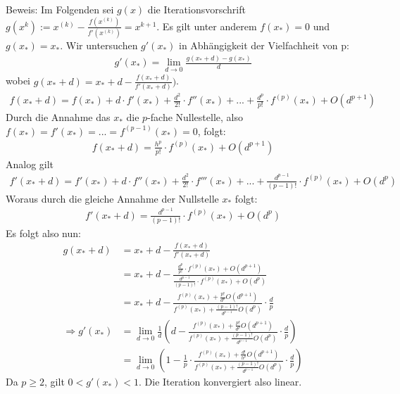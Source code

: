Beweis: Im Folgenden sei $g(x)$ die Iterationsvorschrift $g(x^k):= x^{(k)} - \frac{f(x^{(k)})}{f'(x^{(k)})} = x^{k+1}$. Es gilt unter anderem $f(x_*) = 0$ und $g(x_*) = x_*$. Wir untersuchen
$g'(x_*)$ in Abhängigkeit der Vielfachheit von p:
\begin{align*}
g'(x_*) = \lim\limits_{d \rightarrow 0} \frac{g(x_* +d) - g(x_*)}{d}
\end{align*}
wobei $g(x_*+d) = x_*+d-\frac{f(x_*+d)}{f'(x_*+d)})$.
\begin{align*}
f(x_*+d) = f(x_*) + d \cdot f'(x_*) +\frac{d^2}{2!}\cdot f''(x_*) + ... + \frac{d^p}{p!}\cdot f^{(p)}(x_*) + O(d^{p+1})
\end{align*}
Durch die Annahme das $x_*$ die $p$-fache Nullestelle, also $f(x_*) = f'(x_*) = ... = f^{(p-1)}(x_*) = 0$, folgt:
\begin{align*}
f(x_*+d) = \frac{h^p}{p!}\cdot f^{(p)}(x_*) + O(d^{p+1})
\end{align*}
Analog gilt
\begin{align*}
f'(x_*+d) = f'(x_*) + d \cdot f''(x_*) +\frac{d^2}{2!}\cdot f'''(x_*) + ... + \frac{d^{p-1}}{(p-1)!}\cdot f^{(p)}(x_*) + O(d^{p})
\end{align*}
Woraus durch die gleiche Annahme der Nullstelle $x_*$ folgt:
\begin{align*}
f'(x_*+d) = \frac{d^{p-1}}{(p-1)!}\cdot f^{(p)}(x_*) + O(d^{p})
\end{align*}
Es folgt also nun:
\begin{align*}
g(x_*+d) &= x_*+d-\frac{f(x_*+d)}{f'(x_*+d)}\\
&= x_*+d-\frac{\frac{d^p}{p!}\cdot f^{(p)}(x_*) + O(d^{p+1})}{\frac{d^{p-1}}{(p-1)!}\cdot f^{(p)}(x_*) + O(d^{p})}\\
&= x_*+d-\frac{f^{(p)}(x_*) + \frac{p!}{d^p} O(d^{p+1})}{f^{(p)}(x_*) + \frac{(p-1)!}{d^{p-1}}O(d^{p})} \cdot \frac{d}{p}\\
\Rightarrow g'(x_*) &= \lim\limits_{d \rightarrow 0} \frac{1}{d}\left(d-\frac{f^{(p)}(x_*) + \frac{p!}{d^p} O(d^{p+1})}{f^{(p)}(x_*) + \frac{(p-1)!}{d^{p-1}}O(d^{p})} \cdot \frac{d}{p} \right)\\
&= \lim\limits_{d \rightarrow 0}\left(1- \frac{1}{p} \cdot \frac{f^{(p)}(x_*) + \frac{d!}{h^p} O(d^{p+1})}{f^{(p)}(x_*) + \frac{(p-1)!}{d^{p-1}}O(d^{p})} \cdot \frac{d}{p} \right)
\end{align*}
Da $p\ge2$, gilt $0<g'(x_*) < 1$. Die Iteration konvergiert also linear.

